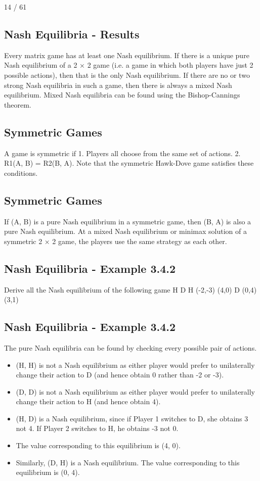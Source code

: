 \documentclass[]{report}
\begin{document}
14 / 61
\subsection{Nash Equilibria - Results}
Every matrix game has at least one Nash equilibrium.
If there is a unique pure Nash equilibrium of a 2 × 2 game (i.e. a
game in which both players have just 2 possible actions), then that
is the only Nash equilibrium.
If there are no or two strong Nash equilibria in such a game, then
there is always a mixed Nash equilibrium.
Mixed Nash equilibria can be found using the Bishop-Cannings
theorem.
\subsection{Symmetric Games}
A game is symmetric if
1. Players all choose from the same set of actions.
2. R1(A, B) = R2(B, A).
Note that the symmetric Hawk-Dove game satisfies these
conditions.
\subsection{Symmetric Games}
If (A, B) is a pure Nash equilibrium in a symmetric game, then
(B, A) is also a pure Nash equilibrium.
At a mixed Nash equilibrium or minimax solution of a symmetric
2 × 2 game, the players use the same strategy as each other.
\subsection{Nash Equilibria - Example 3.4.2}
Derive all the Nash equilibrium of the following game
H D
H (-2,-3) (4,0)
D (0,4) (3,1)
\subsection{Nash Equilibria - Example 3.4.2}
The pure Nash equilibria can be found by checking every possible
pair of actions.
\begin{itemize}
	\item (H, H) is not a Nash equilibrium as either player would prefer to
	unilaterally change their action to D (and hence obtain 0 rather
	than -2 or -3).
	\item (D, D) is not a Nash equilibrium as either player would prefer to
	unilaterally change their action to H (and hence obtain 4).
	\item (H, D) is a Nash equilibrium, since if Player 1 switches to D, she
	obtains 3 not 4. If Player 2 switches to H, he obtains -3 not 0.
	\item	The value corresponding to this equilibrium is (4, 0).
	\item	Similarly, (D, H) is a Nash equilibrium. The value corresponding to
	this equilibrium is (0, 4).
\end{itemize}
\end{document}
